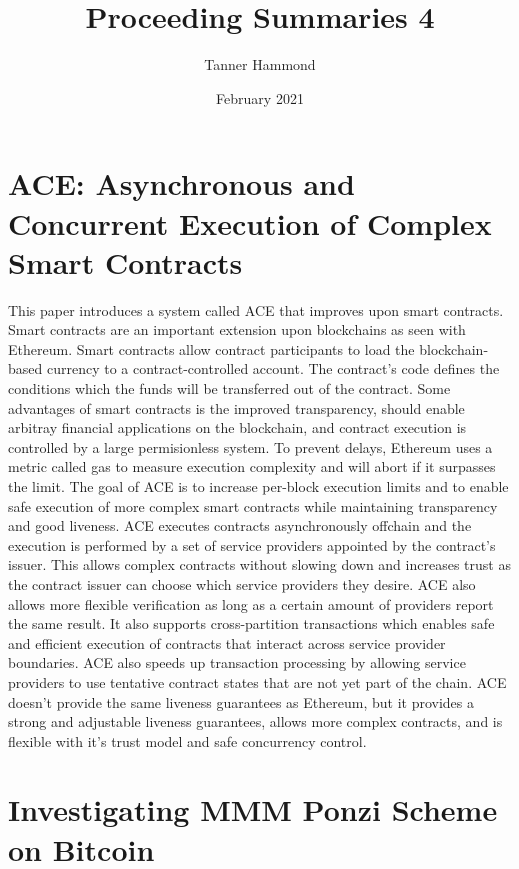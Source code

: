 \documentclass{article}
\title{Proceeding Summaries 4}
\author{Tanner Hammond}
\date{February 2021}
\begin{document}
\maketitle

\section{ACE: Asynchronous and Concurrent Execution of Complex Smart Contracts \cite{10.1145/3372297.3417243}}

This paper introduces a system called ACE that improves upon smart contracts. Smart contracts are an important extension upon blockchains as seen with Ethereum. Smart contracts allow contract participants to load the blockchain-based currency to a contract-controlled account. The contract's code defines the conditions which the funds will be transferred out of the contract. Some advantages of smart contracts is the improved transparency, should enable arbitray financial applications on the blockchain, and contract execution is controlled by a large permisionless system. To prevent delays, Ethereum uses a metric called gas to measure execution complexity and will abort if it surpasses the limit. The goal of ACE is to increase per-block execution limits and to enable safe execution of more complex smart contracts while maintaining transparency and good liveness. ACE executes contracts asynchronously offchain and the execution is performed by a set of service providers appointed by the contract's issuer. This allows complex contracts without slowing down and increases trust as the contract issuer can choose which service providers they desire. ACE also allows more flexible verification as long as a certain amount of providers report the same result. It also supports cross-partition transactions which enables safe and efficient execution of contracts that interact across service provider boundaries. ACE also speeds up transaction processing by allowing service providers to use tentative contract states that are not yet part of the chain. ACE doesn't provide the same liveness guarantees as Ethereum, but it provides a strong and adjustable liveness guarantees, allows more complex contracts, and is flexible with it's trust model and safe concurrency control.

\section{Investigating MMM Ponzi Scheme on Bitcoin \cite{10.1145/3320269.3384719}}
\end{document}
